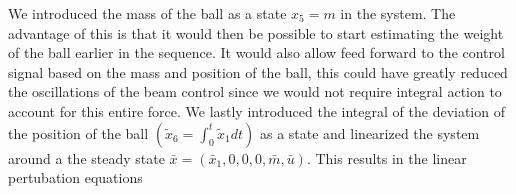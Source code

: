 We introduced the mass of the ball as a state $x_{5}=m$ in the system. The advantage of this is that it would then be possible to start estimating the weight of the ball earlier in the sequence.
It would also allow feed forward to the control signal based on the mass and position of the ball, this could have greatly reduced the oscillations of the beam control since we would not require integral action to account for this entire force.
We lastly introduced the integral of the deviation of the position of the
ball $(\tilde{x}_{6}=\int_{0}^{t}\tilde{x}_{1}dt)$ as a state and linearized the system around a the steady state $\bar{x}=(\bar{x}_{1},0,0,0,\bar{m},\bar{u})$.
This results in the linear pertubation equations

